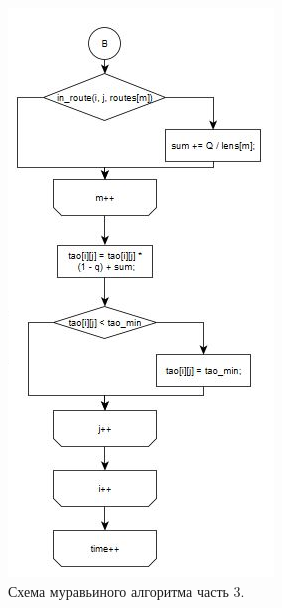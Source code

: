 \documentclass[12pt]{report}
\begin{document}
	\begin{figure}[H]
		\begin{center}
			\includegraphics[scale=1]{img/formic3.png}
			\caption{Схема муравьиного алгоритма часть 3.}
			\label{fig:formic3}
		\end{center}
	\end{figure}
	
\end{document}
